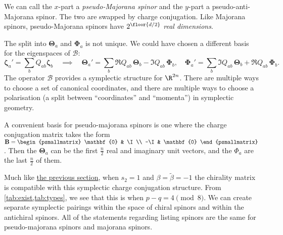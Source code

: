 \documentclass[11pt]{article}
\newcommand{\B}{\mathbf{B}}
\newcommand{\Thetab}{\boldsymbol{\Theta}}
\newcommand{\Phib}{\boldsymbol{\Phi}}
\newcommand{\zetab}{\boldsymbol{\zeta}}
\newcommand{\betat}{\tilde{\beta}}
\begin{document}
We can call the \(x\)-part a \emph{pseudo-Majorana spinor} and the \(y\)-part a pseudo-anti-Majorana spinor.
The two are swapped by charge conjugation.
Like Majorana spinors, pseudo-Majorana spinors have $2^{\floor{d/2}}$ \emph{real dimensions}.

The split into \(\Thetab_a\) and \(\Phib_a\) is not unique.
We could have chosen a different basis for the eigenspaces of \(\mathcal{B}\):
%
\begin{equation*}
  \zetab_a' = \sum_b Q_{ab} \zetab_b
  \quad \implies \quad
  \Thetab_a' = \sum_b \Re Q_{ab}\, \Thetab_b - \Im Q_{ab}\, \Phib_b,
  \quad
  \Phib_a'   = \sum_b \Im Q_{ab}\, \Thetab_b + \Re Q_{ab}\, \Phib_b.
\end{equation*}
%
The operator \(\mathcal{B}\) provides a symplectic structure for \(\R^{2n}\).
There are multiple ways to choose a set of canonical coordinates, and there are multiple ways to choose a polarisation (a split between ``coordinates'' and ``momenta'') in symplectic geometry.

A convenient basis for pseudo-majorana spinors is one where the charge conjugation matrix takes the form 
\( \B = \begin{psmallmatrix}
          \mathbf{0} & \I \\
          -\I & \mathbf{0}
        \end{psmallmatrix}\).
Then the \(\Thetab_a\) can be the first \(\frac{n}{2}\) real and imaginary unit vectors, and the \(\Phi_a\) are the last \(\frac{n}{2}\) of them.

Much like \hyperref[sec:majorana]{the previous section}, when \(s_2 = 1\) and \(\beta = \betat = -1\) the chirality matrix is compatible with this symplectic charge conjugation structure.
From \cref{tab:exist,tab:types}, we see that this is when \( p-q = 4 \pmod 8 \).
We can create separate symplectic pairings within the space of chiral spinors and within the antichiral spinors.
All of the statements regarding listing spinors are the same for pseudo-majorana spinors and majorana spinors.




\end{document}
